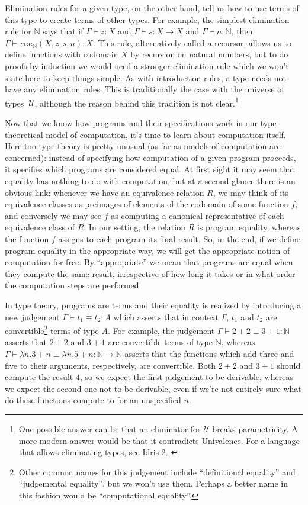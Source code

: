 \documentclass[declaration,mgr,english,shortabstract]{iithesis}
\newcommand{\m}[1]{\texttt{#1}}
\newcommand{\term}[3]{#1 \vdash #2 : #3}
\newcommand{\termconv}[4]{#1 \vdash #2 \equiv #3 : #4}
\newcommand{\N}{\mathbb{N}}
\newcommand{\recN}[4]{\m{rec}_\N(#1, #2, #3, #4)}
\begin{document}
Elimination rules for a given type, on the other hand, tell us how to use terms of this type to create terms of other types. For example, the simplest elimination rule for $\N$ says that if $\term{\Gamma}{z}{X}$ and $\term{\Gamma}{s}{X \to X}$ and $\term{\Gamma}{n}{\N}$, then $\term{\Gamma}{\recN{X}{z}{s}{n}}{X}$. This rule, alternatively called a recursor, allows us to define functions with codomain $X$ by recursion on natural numbers, but to do proofs by induction we would need a stronger elimination rule which we won't state here to keep things simple. As with introduction rules, a type needs not have any elimination rules. This is traditionally the case with the universe of types $\ \mathcal{U}$, although the reason behind this tradition is not clear.\footnote{One possible answer can be that an eliminator for $\mathcal{U}$ breaks parametricity. A more modern answer \cite{HoTTBlog} would be that it contradicts Univalence. For a language that allows eliminating types, see Idris 2. \cite{Idris2}}

\label{convertible}

Now that we know how programs and their specifications work in our type-theoretical model of computation, it's time to learn about computation itself. Here too type theory is pretty unusual (as far as models of computation are concerned): instead of specifying how computation of a given program proceeds, it specifies which programs are considered equal. At first sight it may seem that equality has nothing to do with computation, but at a second glance there is an obvious link: whenever we have an equivalence relation $R$, we may think of its equivalence classes as preimages of elements of the codomain of some function $f$, and conversely we may see $f$ as computing a canonical representative of each equivalence class of $R$. In our setting, the relation $R$ is program equality, whereas the function $f$ assigns to each program its final result. So, in the end, if we define program equality in the appropriate way, we will get the appropriate notion of computation for free. By ``appropriate'' we mean that programs are equal when they compute the same result, irrespective of how long it takes or in what order the computation steps are performed.

In type theory, programs are terms and their equality is realized by introducing a new judgement $\termconv{\Gamma}{t_1}{t_2}{A}$ which asserts that in context $\Gamma$, $t_1$ and $t_2$ are convertible\footnote{Other common names for this judgement include ``definitional equality'' and ``judgemental equality'', but we won't use them. Perhaps a better name in this fashion would be ``computational equality''.} terms of type $A$. For example, the judgement $\termconv{\Gamma}{2 + 2}{3 + 1}{\N}$ asserts that $2 + 2$ and $3 + 1$ are convertible terms of type $\N$, whereas $\termconv{\Gamma}{\lambda n. 3 + n}{\lambda n. 5 + n}{\N \to \N}$ asserts that the functions which add three and five to their arguments, respectively, are convertible. Both $2 + 2$ and $3 + 1$ should compute the result $4$, so we expect the first judgement to be derivable, whereas we expect the second one not to be derivable, even if we're not entirely sure what do these functions compute to for an unspecified $n$.
\end{document}
